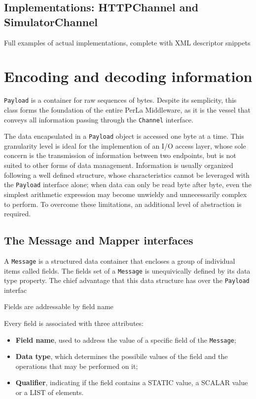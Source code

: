 \subsection{Implementations: HTTPChannel and SimulatorChannel}
\label{sec:channel.implementations}

Full examples of actual implementations, complete with XML descriptor snippets


\section{Encoding and decoding information}
\label{sec:components.mapper}

\texttt{Payload} is a container for raw sequences of bytes. Despite its
semplicity, this class forms the foundation of the entire PerLa Middleware, as
it is the vessel that conveys all information passing through the
\texttt{Channel} interface.

The data encapsulated in a \texttt{Payload} object is accessed one byte at a
time. This granularity level is ideal for the implemention of an I/O access
layer, whose sole concern is the transmission of information between two
endpoints, but is not suited to other forms of data management. Information is
usually organized following a well defined structure, whose characteristics
cannot be leveraged with the \texttt{Payload} interface alone; when data can
only be read byte after byte, even the simplest arithmetic expression may
become unwieldy and unnecessarily complex to perform. To overcome these
limitations, an additional level of abstraction is required.


\subsection{The Message and Mapper interfaces}

A \texttt{Message} is a structured data container that encloses a group of
individual items called fields. The fields set of a \texttt{Message} is
unequivically defined by its data type property. The chief advantage that this
data structure has over the \texttt{Payload} interfac

Fields are addressable by field name

Every field is associated with three attributes:
\begin{itemize}
  \item \textbf{Field name}, used to address the value of a specific
  field of the \texttt{Message};
  \item \textbf{Data type}, which determines the possibile values of the field
  and the operations that may be performed on it;
  \item \textbf{Qualifier}, indicating if the field contains a STATIC value, a
  SCALAR value or a LIST of elements. 
\end{itemize}

